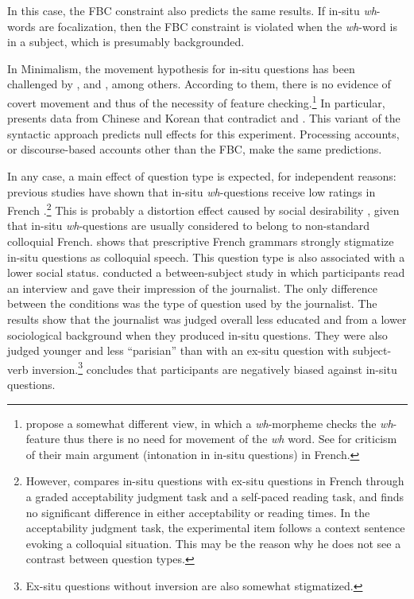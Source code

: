 In this case, the FBC constraint also predicts the same results. If in-situ \emph{wh}-words are focalization, then the FBC constraint is violated when the \emph{wh}-word is in a subject, which is presumably backgrounded.\largerpage

In Minimalism, the movement hypothesis for in-situ questions has been challenged by \citet{Comorovski.1996}, \citet{Reinhart.1997} and \citet{Adli.2006}, among others. According to them, there is no evidence of covert movement and thus of the necessity of feature checking.{\footnote{\citet{Cheng.2000} propose a somewhat different view, in which a \emph{wh}-morpheme checks the \emph{wh}-feature thus there is no need for movement of the \emph{wh} word. See \citet{Adli.2006} for criticism of their main argument (intonation in in-situ questions) in French.}} In particular, \citet{Reinhart.1997} presents data from Chinese and Korean that contradict \citet{Huang.1982} and \citet{Cheng.1991}. This variant of the syntactic approach predicts null effects for this experiment. Processing accounts, or discourse-based accounts other than the FBC, make the same predictions.

In any case, a main effect of question type is expected, for independent reasons: previous studies have shown that in-situ \emph{wh}-questions receive low ratings in French \citep{Thiberge.2018}.\footnote{However, \citet{Adli.2006} compares in-situ questions with ex-situ questions in French through a graded acceptability judgment task and a self-paced reading task, and finds no significant difference in either acceptability or reading times. In the acceptability judgment task, the experimental item follows a context sentence evoking a colloquial situation. This may be the reason why he does not see a contrast between question types.}
This is probably a distortion effect caused by social desirability \citep{Edwards.1957}, given that in-situ \emph{wh}-questions are usually considered to belong to non-standard colloquial French. \citet[98]{Coveney.1996} shows that prescriptive French grammars strongly stigmatize in-situ questions as colloquial speech. This question type is also associated with a lower social status. 
\citet{Thiberge.2018} conducted a between-subject study in which participants read an interview and gave their impression of the journalist. The only difference between the conditions was the type of question used by the journalist. The results show that the journalist was judged overall less educated and from a lower sociological background when they produced in-situ questions. They were also judged younger and less ``parisian'' than with an ex-situ question with subject-verb inversion.\footnote{Ex-situ questions without inversion are also somewhat stigmatized.}\citet{Thiberge.2018} concludes that participants are negatively biased against in-situ questions.

